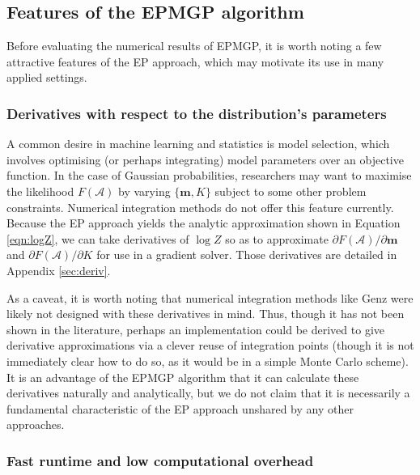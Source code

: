 \documentclass[twoside,11pt]{article}
\def\m{{\mathbf m}}
\def\regionA{\mathcal{A}}
\begin{document}
\subsection{Features of the EPMGP algorithm}
\label{sec:advantages}

Before evaluating the numerical results of EPMGP, it is worth noting a few attractive features of the EP approach, which may motivate its use in many applied settings.

\subsubsection{Derivatives with respect to the distribution's parameters}
\label{sec:deriv-with-resp}

A common desire in machine learning and statistics is model selection, which involves optimising (or perhaps integrating) model parameters over an objective function.  In the case of Gaussian probabilities, researchers may want to maximise the likelihood $F(\regionA)$ by varying $\{\m,K\}$ subject to some other problem constraints.  Numerical integration methods do not offer this feature currently.  Because the EP approach yields the analytic approximation shown in Equation \ref{eqn:logZ}, we can take derivatives of $\log Z$ so as to approximate $\partial F(\regionA) / \partial \m$ and $\partial F(\regionA) / \partial K$ for use in a gradient solver.  Those derivatives are detailed in Appendix \ref{sec:deriv}.

As a caveat, it is worth noting that numerical integration methods like Genz were likely not designed with these derivatives in mind.  Thus, though it has not been shown in the literature, perhaps an implementation could be derived to give derivative approximations via a clever reuse of integration points (though it is not immediately clear how to do so, as it would be in a simple Monte Carlo scheme).  It is an advantage of the EPMGP algorithm that it can calculate these derivatives naturally and analytically, but we do not claim that it is necessarily a fundamental characteristic of the EP approach unshared by any other approaches.

\subsubsection{Fast runtime and low computational overhead}
\end{document}
